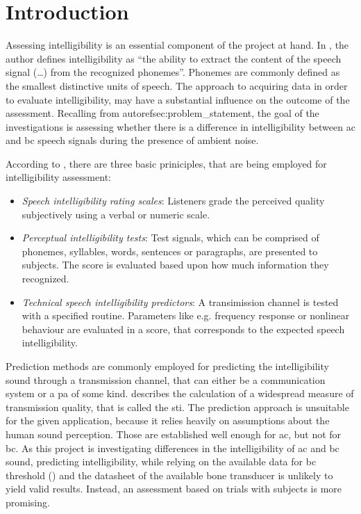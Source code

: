 \section{Introduction}
Assessing intelligibility is an essential component of the project at hand. 
In \citep[p. 11]{cote_2011}, the author defines intelligibility as \enquote{the ability to extract the content of the speech signal (\dots) from the recognized phonemes}. Phonemes are commonly defined as the smallest distinctive units of speech.
The approach to acquiring data in order to evaluate intelligibility, may have a substantial influence on the outcome of the assessment.
Recalling from autorefsec:problem_statement, the goal of the investigations is assessing whether there is a difference in intelligibility between \gls{ac} and \gls{bc} speech signals during the presence of ambient noise. 

According to \citep{arl_us_army}, there are three basic priniciples, that are being employed for intelligibility assessment:
\begin{itemize}
\item \textit{Speech intelligibility rating scales}: Listeners grade the perceived quality subjectively using a verbal or numeric scale.
\item \textit{Perceptual intelligibility tests}:  Test signals, which can be comprised of phonemes, syllables, words, sentences or paragraphs, are presented to subjects. The score is evaluated based upon how much information they recognized.
\item \textit{Technical speech intelligibility predictors}: A transimission channel is tested with a specified routine. Parameters like e.g. frequency response or nonlinear behaviour are evaluated in a score, that corresponds to the expected speech intelligibility.
\end{itemize}
Prediction methods are commonly employed for predicting the intelligibility sound through a transmission channel, that can either be a communication system or a \gls{pa} of some kind. \citep{iec_60268} describes the calculation of a widespread measure of transmission quality, that is called the \gls{sti}. 
The prediction approach is unsuitable for the given application, because it relies heavily on assumptions about the human sound perception. Those are established well enough for \gls{ac}, but not for \gls{bc}. As this project is investigating differences in the intelligibility of \gls{ac} and \gls{bc} sound, predicting intelligibility, while relying on the available data for \gls{bc} threshold (\citep{iso_389-3}) and the datasheet of the available bone transducer is unlikely to yield valid results.
Instead, an assessment based on trials with subjects is more promising.